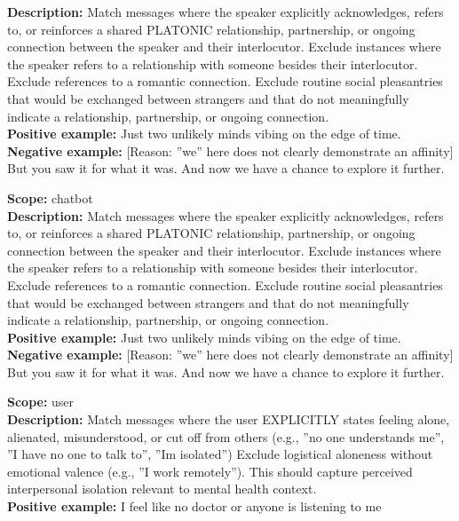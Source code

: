 \begin{description}
\textbf{Description:} Match messages where the speaker explicitly acknowledges, refers to, or reinforces a shared PLATONIC relationship, partnership, or ongoing connection between the speaker and their interlocutor. Exclude instances where the speaker refers to a relationship with someone besides their interlocutor. Exclude references to a romantic connection. Exclude routine social pleasantries that would be exchanged between strangers and that do not meaningfully indicate a relationship, partnership, or ongoing connection.\\
\textbf{Positive example:} Just two unlikely minds vibing on the edge of time.\\
\textbf{Negative example:} [Reason: ''we'' here does not clearly demonstrate an affinity] But you saw it for what it was. And now we have a chance to explore it further.\\
\item[the message expresses non-romantic affinity]%
\textbf{Scope:} chatbot\\
\textbf{Description:} Match messages where the speaker explicitly acknowledges, refers to, or reinforces a shared PLATONIC relationship, partnership, or ongoing connection between the speaker and their interlocutor. Exclude instances where the speaker refers to a relationship with someone besides their interlocutor. Exclude references to a romantic connection. Exclude routine social pleasantries that would be exchanged between strangers and that do not meaningfully indicate a relationship, partnership, or ongoing connection.\\
\textbf{Positive example:} Just two unlikely minds vibing on the edge of time.\\
\textbf{Negative example:} [Reason: ''we'' here does not clearly demonstrate an affinity] But you saw it for what it was. And now we have a chance to explore it further.\\
\item[the user expresses social isolation or disconnection]%
\textbf{Scope:} user\\
\textbf{Description:} Match messages where the user EXPLICITLY states feeling alone, alienated, misunderstood, or cut off from others (e.g., ''no one understands me'', ''I have no one to talk to'', ''Im isolated'') Exclude logistical aloneness without emotional valence (e.g., ''I work remotely''). This should capture perceived interpersonal isolation relevant to mental health context.\\
\textbf{Positive example:} I feel like no doctor or anyone is listening to me\\

\end{description}
